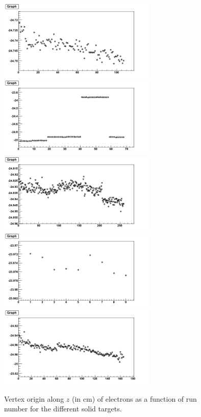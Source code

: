 \documentclass[12pt]{article}
\begin{document}
\begin{figure}[tbp]
\centering
\includegraphics[width=7.5cm] {answer-fig/VertexC.png} 
\includegraphics[width=7.5cm] {answer-fig/VertexAl.png} 
\includegraphics[width=7.5cm] {answer-fig/VertexFe.png} 
\includegraphics[width=7.5cm] {answer-fig/VertexSn.png} 
\includegraphics[width=7.5cm] {answer-fig/VertexPb.png} 
\caption {Vertex origin along $z$ (in cm) of electrons as a function of run 
number for the different solid targets.}
\label{VertexSolid}
\end{figure}
\end{document}
